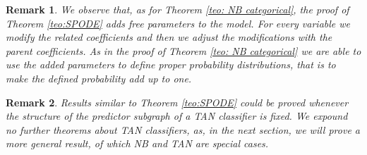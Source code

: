 \documentclass[11pt,a4paper, twoside]{book}
\newtheorem{remark}{Remark}[chapter]
\begin{document}
\begin{remark}  \label{rmrk:1}
We observe that, as for Theorem \ref{teo: NB categorical}, the proof of Theorem \ref{teo:SPODE} adds \textit{free} parameters to the model. For every variable we modify the related coefficients and then we adjust the modifications with the parent coefficients. As in the proof of Theorem \ref{teo: NB categorical} we are able to use the added parameters to define proper probability distributions, that is to make the defined probability add up to one.   \end{remark}
\begin{remark}  \label{rmrk:2}
Results similar to Theorem \ref{teo:SPODE} could be proved whenever the structure of the predictor subgraph of a TAN classifier is fixed. We expound no further theorems about TAN classifiers, as, in the next section, we will prove a more general result, of which NB and TAN are special cases.    \end{remark}
\end{document}
